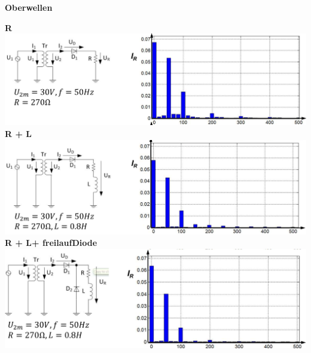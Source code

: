 %
\textbf{Oberwellen}\newline
\vspace{-1cm}
\begin{multicols}{3}
    \textbf{ \qquad R}\newline   
    \includegraphics[width=\linewidth]{images/M1UR}   
    \textbf{\null \qquad R + L}\newline
    \includegraphics[width=\linewidth]{images/M1URL}
    \textbf{ \qquad R + L+ freilaufDiode}\newline
    \includegraphics[width=\linewidth]{images/M1URLD}
\end{multicols}
\clearpage

